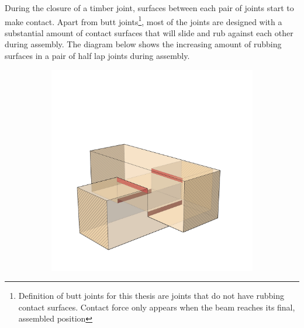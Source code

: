 \documentclass[11pt]{book}
\begin{document}
During the closure of a timber joint, surfaces between each pair of joints start to make contact. Apart from butt joints\footnote{ Definition of butt joints for this thesis are joints that do not have rubbing contact surfaces. Contact force only appears when the beam reaches its final, assembled position}, most of the joints are designed with a substantial amount of contact surfaces that will slide and rub against each other during assembly. The diagram below shows the increasing amount of rubbing surfaces in a pair of half lap joints during assembly. 

\begin{figure}[H]
\centering
\begin{subfigure}[b]{0.3\textwidth}
\centering
\includegraphics[width=\textwidth]{./images/image17.jpg}
\end{subfigure}
\hfill
\begin{subfigure}[b]{0.3\textwidth}
\centering

\end{subfigure}
\end{figure}
\end{document}
